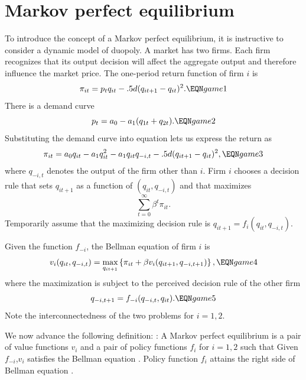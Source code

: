 \section{Markov perfect equilibrium}
To introduce the concept of a Markov perfect equilibrium, it is instructive to consider a dynamic model of duopoly.
A  market has two firms. Each firm recognizes that its
output decision will affect the aggregate output and therefore influence the
market price. 
The  one-period return
function of firm $i$ is
$$ \pi_{it} = p_t q_{it} - .5 d (q_{i t+1} - q_{it})^2.  \EQN game1 $$
There is a demand curve
$$ p_t = a_0 - a_1 (q_{1t} +  q_{2t}) .  \EQN game2 $$
Substituting the demand curve into equation  lets us express
the return as
$$ \pi_{it} = a_0 q_{it} - a_1 q_{it}^2 - a_1 q_{it}q_{-i,t}
     - .5 d (q_{it+1} - q_{it})^2 , \EQN game3 $$
where $q_{-i,t}$ denotes the output of the firm other than $i$.
Firm $i$  chooses a decision rule that sets
$q_{it+1}$ as a function of $(q_{it}, q_{-i,t})$  and that  maximizes
$$ \sum_{t=0}^\infty \beta^t \pi_{it} .$$
Temporarily assume that  the maximizing
decision rule is $q_{it+1}  = f_i(q_{it}, q_{-i,t})$.


Given the function $f_{-i}$, the Bellman equation
of firm $i$ is
$$ v_i(q_{it}, q_{-i,t}) = \max_{q_{it+1}} \left\{
    \pi_{it} + \beta v_i(q_{it+1}, q_{-i,t+1}) \right\},  \EQN game4 $$
where the maximization is subject to the perceived
decision rule of the other firm
$$ q_{-i,t+1} = f_{-i}(q_{-i,t}, q_{it}). \EQN game5 $$
Note the interconnectedness of  the two problems for $i=1,2$.

We now advance  the following definition:
\medskip
{}:
 A Markov perfect equilibrium is a  pair of  value
functions $v_i$ and a pair of policy functions
$f_i$ for $i=1,2$ such that
\medskip
{} Given $f_{-i}$,$v_i$ satisfies
the Bellman equation  .
\medskip
{}  Policy function $f_i$ attains the right side
of  Bellman equation .
\medskip

